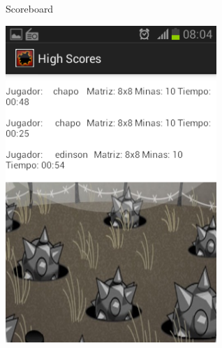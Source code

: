 \documentclass[11pt]{article} %
\begin{document}
\begin{center}
Scoreboard

\includegraphics[width=8cm]{imagenes/Screenshot_2013-12-11-08-04-54.png}
\end{center}













  
\end{document}
